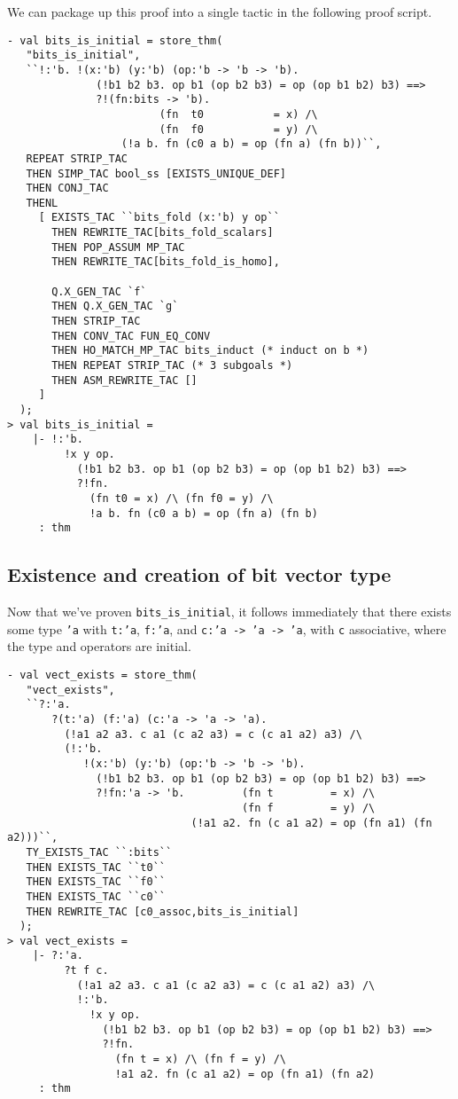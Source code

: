 We can package up this proof into a single tactic in the following proof script.
%
\begin{session}
\begin{verbatim}
- val bits_is_initial = store_thm(
   "bits_is_initial",
   ``!:'b. !(x:'b) (y:'b) (op:'b -> 'b -> 'b).
              (!b1 b2 b3. op b1 (op b2 b3) = op (op b1 b2) b3) ==>
              ?!(fn:bits -> 'b).
                        (fn  t0           = x) /\
                        (fn  f0           = y) /\
                  (!a b. fn (c0 a b) = op (fn a) (fn b))``,
   REPEAT STRIP_TAC
   THEN SIMP_TAC bool_ss [EXISTS_UNIQUE_DEF]
   THEN CONJ_TAC
   THENL
     [ EXISTS_TAC ``bits_fold (x:'b) y op``
       THEN REWRITE_TAC[bits_fold_scalars]
       THEN POP_ASSUM MP_TAC
       THEN REWRITE_TAC[bits_fold_is_homo],

       Q.X_GEN_TAC `f`
       THEN Q.X_GEN_TAC `g`
       THEN STRIP_TAC
       THEN CONV_TAC FUN_EQ_CONV
       THEN HO_MATCH_MP_TAC bits_induct (* induct on b *)
       THEN REPEAT STRIP_TAC (* 3 subgoals *)
       THEN ASM_REWRITE_TAC []
     ]
  );
> val bits_is_initial =
    |- !:'b.
         !x y op.
           (!b1 b2 b3. op b1 (op b2 b3) = op (op b1 b2) b3) ==>
           ?!fn.
             (fn t0 = x) /\ (fn f0 = y) /\
             !a b. fn (c0 a b) = op (fn a) (fn b)
     : thm
\end{verbatim}
\end{session}

\subsection{Existence and creation of bit vector type}

Now that we've proven \texttt{bits\_is\_initial}, it follows immediately that
there exists some type \texttt{'a} with \texttt{t:'a}, \texttt{f:'a},
and \texttt{c:'a~->~'a~->~'a}, with \texttt{c} associative, where the
type and operators are initial.
%
\begin{session}
\begin{verbatim}
- val vect_exists = store_thm(
   "vect_exists",
   ``?:'a.
       ?(t:'a) (f:'a) (c:'a -> 'a -> 'a).
         (!a1 a2 a3. c a1 (c a2 a3) = c (c a1 a2) a3) /\
         (!:'b.
            !(x:'b) (y:'b) (op:'b -> 'b -> 'b).
              (!b1 b2 b3. op b1 (op b2 b3) = op (op b1 b2) b3) ==>
              ?!fn:'a -> 'b.         (fn t         = x) /\
                                     (fn f         = y) /\
                             (!a1 a2. fn (c a1 a2) = op (fn a1) (fn a2)))``,
   TY_EXISTS_TAC ``:bits``
   THEN EXISTS_TAC ``t0``
   THEN EXISTS_TAC ``f0``
   THEN EXISTS_TAC ``c0``
   THEN REWRITE_TAC [c0_assoc,bits_is_initial]
  );
> val vect_exists =
    |- ?:'a.
         ?t f c.
           (!a1 a2 a3. c a1 (c a2 a3) = c (c a1 a2) a3) /\
           !:'b.
             !x y op.
               (!b1 b2 b3. op b1 (op b2 b3) = op (op b1 b2) b3) ==>
               ?!fn.
                 (fn t = x) /\ (fn f = y) /\
                 !a1 a2. fn (c a1 a2) = op (fn a1) (fn a2)
     : thm
\end{verbatim}
\end{session}

